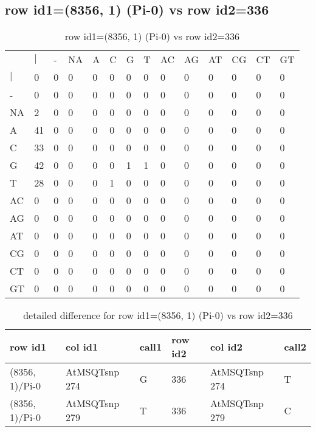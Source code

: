 \subsection{row id1=(8356, 1) (Pi-0) vs row id2=336}
\begin{center}
\begin{longtable}{|l|l|l|l|l|l|l|l|l|l|l|l|l|l|}
\caption{row id1=(8356, 1) (Pi-0) vs row id2=336} \label{table_dm376}\\
\hline
\\
\hline
&$|$&-&NA&A&C&G&T&AC&AG&AT&CG&CT&GT\\
$|$&0&0&0&0&0&0&0&0&0&0&0&0&0\\
-&0&0&0&0&0&0&0&0&0&0&0&0&0\\
NA&2&0&0&0&0&0&0&0&0&0&0&0&0\\
A&41&0&0&0&0&0&0&0&0&0&0&0&0\\
C&33&0&0&0&0&0&0&0&0&0&0&0&0\\
G&42&0&0&0&0&1&1&0&0&0&0&0&0\\
T&28&0&0&0&1&0&0&0&0&0&0&0&0\\
AC&0&0&0&0&0&0&0&0&0&0&0&0&0\\
AG&0&0&0&0&0&0&0&0&0&0&0&0&0\\
AT&0&0&0&0&0&0&0&0&0&0&0&0&0\\
CG&0&0&0&0&0&0&0&0&0&0&0&0&0\\
CT&0&0&0&0&0&0&0&0&0&0&0&0&0\\
GT&0&0&0&0&0&0&0&0&0&0&0&0&0\\
\hline
\end{longtable}
\end{center}

\begin{center}
\begin{longtable}{|l|l|l|l|l|l|}
\caption{detailed difference for row id1=(8356, 1) (Pi-0) vs row id2=336} \label{table_dm377}\\
\hline
row id1&col id1&call1&row id2&col id2&call2\\
\hline
(8356, 1)/Pi-0&AtMSQTsnp 274&G&336&AtMSQTsnp 274&T\\
(8356, 1)/Pi-0&AtMSQTsnp 279&T&336&AtMSQTsnp 279&C\\
\hline
\end{longtable}
\end{center}

